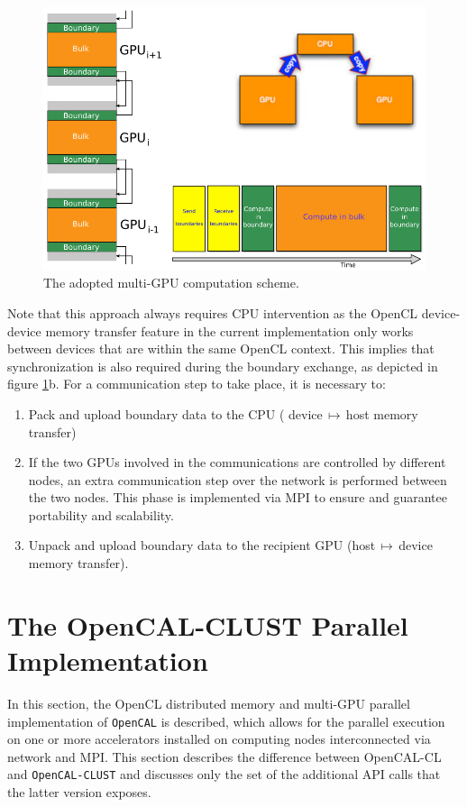 \begin{figure}
    \centering
        \includegraphics[width=1.0\textwidth]{./images/opencal/multigpu_naive_exchange.png}
        \caption{The adopted multi-GPU computation scheme.}
        \label{fig:multigpu_naive_exchange}
\end{figure}


Note that this approach always requires CPU intervention as the OpenCL device-device memory transfer feature in the current implementation only works between devices that are within the same OpenCL context. This implies that synchronization is also required during the boundary exchange, as depicted in figure \ref{fig:multigpu_naive_exchange}b.
For a communication step to take place, it is necessary to:
\begin{enumerate}
    \item Pack and upload boundary data to the CPU ( device$\,\mapsto\,$host  memory transfer)
    \item If the two GPUs involved in the communications are controlled by different nodes, an extra communication step over the network is performed between the two nodes. This phase is implemented via MPI \cite{Forum:1994:MMI:898758} to ensure and guarantee portability and scalability. 
    \item Unpack and upload boundary data to the recipient GPU (host$\,\mapsto\,$device memory transfer).
\end{enumerate}


\section{The OpenCAL-CLUST  Parallel Implementation}
\label{sec:opencal_cluster_implementation}
  In this section, the OpenCL distributed memory and multi-GPU parallel implementation of \texttt{OpenCAL} is described, which allows for the parallel execution on one or more accelerators installed on computing nodes interconnected via network and MPI.
This section describes the difference between OpenCAL-CL and \texttt{OpenCAL-CLUST}  and discusses only the set of the additional API calls that the latter version exposes. 


